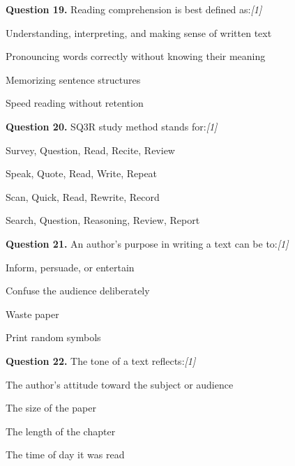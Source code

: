 \documentclass[11pt,a4paper]{article}
\newcommand{\pts}[1]{\hfill   \textit{[#1]}}
\begin{document}
\medskip




\noindent   \textbf{Question 19.} Reading comprehension is best defined as:\pts{1}

\begin{parts}
  \item Understanding, interpreting, and making sense of written text
  \item Pronouncing words correctly without knowing their meaning
  \item Memorizing sentence structures
  \item Speed reading without retention
\end{parts}

\medskip




\noindent   \textbf{Question 20.} SQ3R study method stands for:\pts{1}

\begin{parts}
  \item Survey, Question, Read, Recite, Review
  \item Speak, Quote, Read, Write, Repeat
  \item Scan, Quick, Read, Rewrite, Record
  \item Search, Question, Reasoning, Review, Report
\end{parts}

\medskip




\noindent   \textbf{Question 21.} An author's purpose in writing a text can be to:\pts{1}

\begin{parts}
  \item Inform, persuade, or entertain
  \item Confuse the audience deliberately
  \item Waste paper
  \item Print random symbols
\end{parts}

\medskip




\noindent   \textbf{Question 22.} The tone of a text reflects:\pts{1}

\begin{parts}
  \item The author's attitude toward the subject or audience
  \item The size of the paper
  \item The length of the chapter
  \item The time of day it was read
\end{parts}
\end{document}

